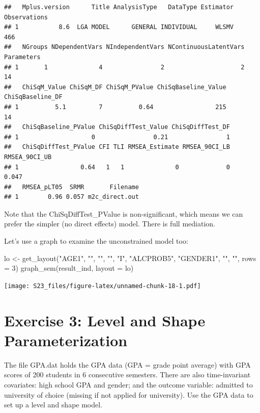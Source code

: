 \documentclass[
]{book}
\newenvironment{Shaded}{\begin{snugshade}}{\end{snugshade}}
\newcommand{\AttributeTok}[1]{\textcolor[rgb]{0.77,0.63,0.00}{#1}}
\newcommand{\DecValTok}[1]{\textcolor[rgb]{0.00,0.00,0.81}{#1}}
\newcommand{\FunctionTok}[1]{\textcolor[rgb]{0.00,0.00,0.00}{#1}}
\newcommand{\NormalTok}[1]{#1}
\newcommand{\OtherTok}[1]{\textcolor[rgb]{0.56,0.35,0.01}{#1}}
\newcommand{\StringTok}[1]{\textcolor[rgb]{0.31,0.60,0.02}{#1}}
\begin{document}
\begin{verbatim}
##   Mplus.version      Title AnalysisType   DataType Estimator Observations
## 1           8.6  LGA MODEL      GENERAL INDIVIDUAL     WLSMV          466
##   NGroups NDependentVars NIndependentVars NContinuousLatentVars Parameters
## 1       1              4                2                     2         14
##   ChiSqM_Value ChiSqM_DF ChiSqM_PValue ChiSqBaseline_Value ChiSqBaseline_DF
## 1          5.1         7          0.64                 215               14
##   ChiSqBaseline_PValue ChiSqDiffTest_Value ChiSqDiffTest_DF
## 1                    0                0.21                1
##   ChiSqDiffTest_PValue CFI TLI RMSEA_Estimate RMSEA_90CI_LB RMSEA_90CI_UB
## 1                 0.64   1   1              0             0         0.047
##   RMSEA_pLT05  SRMR       Filename
## 1        0.96 0.057 m2c_direct.out
\end{verbatim}

Note that the ChiSqDiffTest\_PValue is non-significant, which means we can
prefer the simpler (no direct effects) model. There is full mediation.

Let's use a graph to examine the unconstrained model too:

\begin{Shaded}
\begin{Highlighting}[]
\NormalTok{lo }\OtherTok{\textless{}{-}} \FunctionTok{get\_layout}\NormalTok{(}\StringTok{"AGE1"}\NormalTok{,    }\StringTok{""}\NormalTok{, }\StringTok{""}\NormalTok{,}
                 \StringTok{""}\NormalTok{,        }\StringTok{"I"}\NormalTok{,  }\StringTok{"ALCPROB5"}\NormalTok{,}
                 \StringTok{"GENDER1"}\NormalTok{, }\StringTok{""}\NormalTok{, }\StringTok{""}\NormalTok{, }\AttributeTok{rows =} \DecValTok{3}\NormalTok{)}
\FunctionTok{graph\_sem}\NormalTok{(result\_ind, }\AttributeTok{layout =}\NormalTok{ lo)}
\end{Highlighting}
\end{Shaded}

\texttt{[image: S23\_files/figure-latex/unnamed-chunk-18-1.pdf]}

\hypertarget{exercise-3-level-and-shape-parameterization}{%
\section{Exercise 3: Level and Shape Parameterization}\label{exercise-3-level-and-shape-parameterization}}

The file GPA.dat holds the GPA data (GPA = grade point average) with GPA scores of 200 students in 6 consecutive
semesters. There are also time-invariant covariates: high school GPA and gender; and the outcome variable:
admitted to university of choice (missing if not applied for university). Use the GPA data to set up a level and shape
model.
\end{document}
